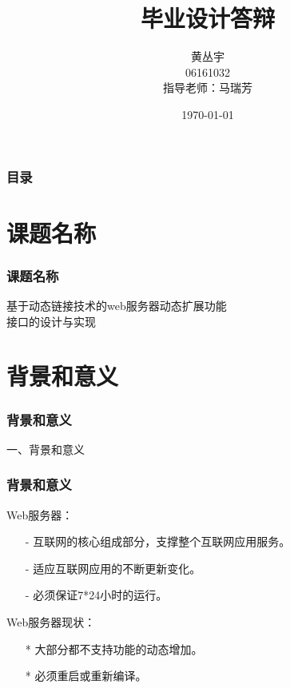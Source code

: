 \documentclass[10pt,dvipdfm]{beamer}
\begin{document}
\title[毕业设计答辩]{\LARGE{毕业设计答辩\\}}
\author[黄丛宇]{黄丛宇\\06161032\\指导老师：马瑞芳}
\date{\today}

\begin{frame}	
	\titlepage
\end{frame}

\begin{frame}
	\frametitle{目录}
	\tableofcontents
\end{frame}

\section{课题名称}
\begin{frame}
	\frametitle{课题名称}
	
	\begin{block}{}
	\begin{center}
	{\Large
			基于动态链接技术的web服务器动态扩展功能\\
				接口的设计与实现
	}
	\end{center}
	\end{block}
	
\end{frame}

\section{背景和意义}

\begin{frame}
	\frametitle{背景和意义}
	\begin{center}
	{\Large
		一、背景和意义
	}
	\end{center}
\end{frame}

\begin{frame}
	\frametitle{背景和意义}
	\begin{block}{Web服务器：}
		\begin{itemize}
			\item[-] 互联网的核心组成部分，支撑整个互联网应用服务。
			\item[-] 适应互联网应用的不断更新变化。
			\item[-] 必须保证7*24小时的运行。
		\end{itemize}
	\end{block}
	
	\pause
	
	\begin{block}{Web服务器现状：}
		\begin{itemize}
			\item[*] 大部分都不支持功能的动态增加。
			\item[*] 必须重启或重新编译。
		\end{itemize}
	\end{block}
	
\end{frame}
\end{document}

